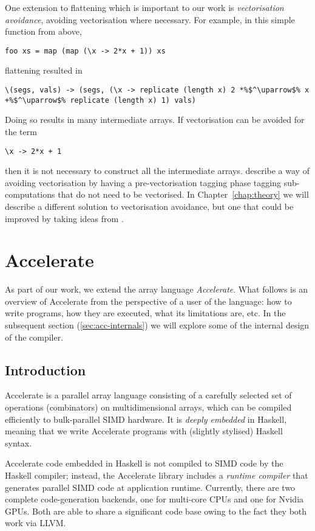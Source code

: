 One extension to flattening which is important to our work is \emph{vectorisation avoidance}, avoiding vectorisation where necessary. For example, in this simple function from above,
%
\begin{lstlisting}
foo xs = map (map (\x -> 2*x + 1)) xs
\end{lstlisting}
%
flattening resulted in
%
%
\begin{lstlisting}
\(segs, vals) -> (segs, (\x -> replicate (length x) 2 *%$^\uparrow$% x +%$^\uparrow$% replicate (length x) 1) vals)
\end{lstlisting}
%
Doing so results in many intermediate arrays. If vectorisation can be avoided for the term
%
\begin{lstlisting}
\x -> 2*x + 1
\end{lstlisting}
%
then it is not necessary to construct all the intermediate arrays. \citet{Keller:avoidance} describe a way of avoiding vectorisation by having a pre-vectorisation tagging phase tagging sub-computations that do not need to be vectorised. In Chapter~\ref{chap:theory} we will describe a different solution to vectorisation avoidance, but one that could be improved by taking ideas from \citet{Keller:avoidance}.

\section{Accelerate}
\label{sec:background-accelerate}

As part of our work, we extend the array language \emph{Accelerate}. What follows is an overview of Accelerate from the perspective of a user of the language: how to write programs, how they are executed, what its limitations are, etc. In the subsequent section (\ref{sec:acc-internals}) we will explore some of the internal design of the compiler.

\subsection{Introduction}
\label{sec:acc-intro}

Accelerate is a parallel array language consisting of a carefully selected set of operations (combinators) on multidimensional arrays, which can be compiled efficiently to bulk-parallel SIMD hardware. It is \emph{deeply embedded} in Haskell, meaning that we write Accelerate programs with (slightly stylised) Haskell syntax.

Accelerate code embedded in Haskell is not compiled to SIMD code by the Haskell compiler; instead, the Accelerate library includes a \emph{runtime compiler} that generates parallel SIMD code at application runtime. Currently, there are two complete code-generation backends, one for multi-core CPUs and one for Nvidia GPUs. Both are able to share a significant code base owing to the fact they both work via LLVM.

